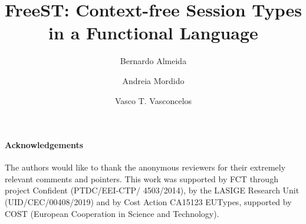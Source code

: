 \documentclass[submission,copyright,creativecommons]{eptcs}
\title{FreeST: Context-free Session Types in a Functional Language}
\author{
  Bernardo Almeida
  \and
  Andreia Mordido
  \and
  Vasco T. Vasconcelos
  \institute{LASIGE, Faculdade de Ciências, Universidade de Lisboa, Portugal}
}
\begin{document}
\maketitle








\paragraph{Acknowledgements} The authors would like to thank the
anonymous reviewers for their extremely relevant comments and
pointers.  This work was supported by FCT through project Confident
(PTDC/EEI-CTP/ 4503/2014), by the LASIGE Research Unit
(UID/CEC/00408/2019) and by Cost Action CA15123 EUTypes, supported by
COST (European Cooperation in Science and Technology).



\end{document}

